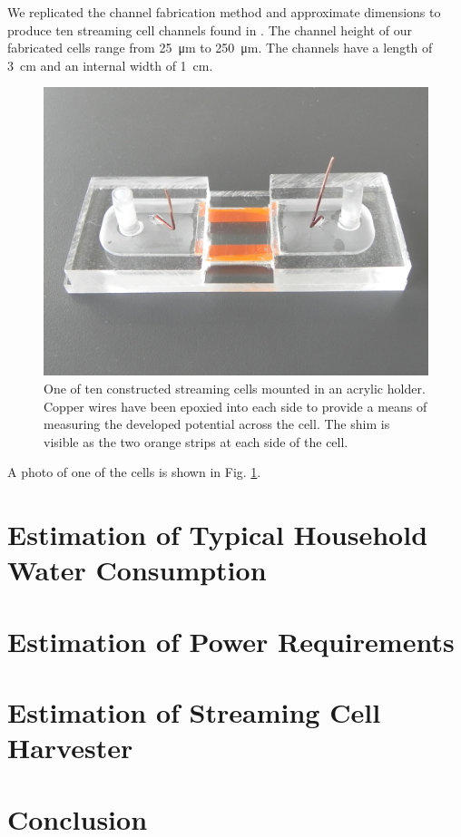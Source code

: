 \documentclass[10pt,final,journal]{IEEEtran}
\begin{document}
    We replicated the channel fabrication method and approximate dimensions to produce ten streaming cell channels found in \cite{Gu2000}.
    The channel height of our fabricated cells range from \SI{25}{\micro\metre} to \SI{250}{\micro\metre}.
    The channels have a length of \SI{3}{\centi\metre} and an internal width of \SI{1}{\centi\metre}.
    \begin{figure}
        \begin{center}
        \includegraphics[width=\linewidth]{Photo_streamingPotential_Assembly_Step3.JPG}
        \end{center}
        \caption{One of ten constructed streaming cells mounted in an acrylic holder. Copper wires have been epoxied into each side to provide a means of measuring the developed potential across the cell. The shim is visible as the two orange strips at each side of the cell.}
        \label{fig:cell}
    \end{figure}
    A photo of one of the cells is shown in Fig. \ref{fig:cell}.

    \section{Estimation of Typical Household Water Consumption}
    \label{sect:waterConsumption}
    \section{Estimation of Power Requirements}
    \label{sect:powerRequirements}
    \section{Estimation of Streaming Cell Harvester}
    \label{sect:harvesterSize}
    \section{Conclusion}
    
     
\end{document}
